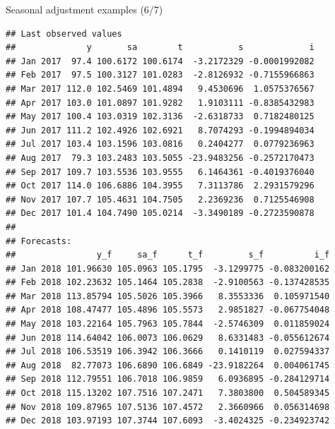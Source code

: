 \documentclass[10pt,xcolor=table,color={dvipsnames,usenames},ignorenonframetext,usepdftitle=false,french]{beamer}
\newenvironment{Shaded}{\begin{snugshade}}{\end{snugshade}}
\newcommand{\NormalTok}[1]{#1}
\newcommand{\OperatorTok}[1]{\textcolor[rgb]{0.81,0.36,0.00}{\textbf{#1}}}
\begin{document}
\begin{frame}[fragile]{Seasonal adjustment examples (6/7)}
\protect\hypertarget{seasonal-adjustment-examples-67}{}

\footnotesize

\begin{Shaded}
\end{Shaded}

\begin{verbatim}
## Last observed values
##              y       sa        t           s             i
## Jan 2017  97.4 100.6172 100.6174  -3.2172329 -0.0001992082
## Feb 2017  97.5 100.3127 101.0283  -2.8126932 -0.7155966863
## Mar 2017 112.0 102.5469 101.4894   9.4530696  1.0575376567
## Apr 2017 103.0 101.0897 101.9282   1.9103111 -0.8385432983
## May 2017 100.4 103.0319 102.3136  -2.6318733  0.7182480125
## Jun 2017 111.2 102.4926 102.6921   8.7074293 -0.1994894034
## Jul 2017 103.4 103.1596 103.0816   0.2404277  0.0779236963
## Aug 2017  79.3 103.2483 103.5055 -23.9483256 -0.2572170473
## Sep 2017 109.7 103.5536 103.9555   6.1464361 -0.4019376040
## Oct 2017 114.0 106.6886 104.3955   7.3113786  2.2931579296
## Nov 2017 107.7 105.4631 104.7505   2.2369236  0.7125546908
## Dec 2017 101.4 104.7490 105.0214  -3.3490189 -0.2723590878
## 
## Forecasts:
##                y_f     sa_f      t_f         s_f          i_f
## Jan 2018 101.96630 105.0963 105.1795  -3.1299775 -0.083200162
## Feb 2018 102.23632 105.1464 105.2838  -2.9100563 -0.137428535
## Mar 2018 113.85794 105.5026 105.3966   8.3553336  0.105971540
## Apr 2018 108.47477 105.4896 105.5573   2.9851827 -0.067754048
## May 2018 103.22164 105.7963 105.7844  -2.5746309  0.011859024
## Jun 2018 114.64042 106.0073 106.0629   8.6331483 -0.055612674
## Jul 2018 106.53519 106.3942 106.3666   0.1410119  0.027594337
## Aug 2018  82.77073 106.6890 106.6849 -23.9182264  0.004061745
## Sep 2018 112.79551 106.7018 106.9859   6.0936895 -0.284129714
## Oct 2018 115.13202 107.7516 107.2471   7.3803800  0.504589345
## Nov 2018 109.87965 107.5136 107.4572   2.3660966  0.056314698
## Dec 2018 103.97193 107.3744 107.6093  -3.4024325 -0.234923742
\end{verbatim}

\end{frame}
\end{document}
